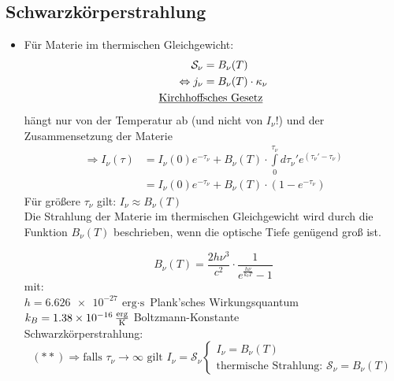 \subsection{Schwarzkörperstrahlung}
\begin{itemize}[label={$\to$}]
\item Für Materie im thermischen Gleichgewicht:
\begin{align*}
\mathcal{S}_\nu&=B_\nu(T)\\
\Leftrightarrow j_\nu &=B_\nu(T)\cdot\kappa_\nu\\
\text{\underline{Kirchhoff}}&\text{\underline{sches Gesetz}}
\end{align*}
hängt nur von der Temperatur ab (und nicht von $I_\nu$!) und der Zusammensetzung der Materie
\begin{align*}
\Rightarrow I_\nu (\tau)&=I_\nu(0)e^{-\tau_\nu}+B_\nu (T)\cdot\int\limits_0^{\tau_\nu}d\tau_\nu'e^{(\tau_\nu'-\tau_\nu)}\\
&=I_\nu(0)e^{-\tau_\nu}+B_\nu(T)\cdot(1-e^{-\tau_\nu})
\end{align*}
Für größere $\tau_\nu$ gilt: $I_\nu\approx B_\nu(T)$\\
Die Strahlung der Materie im thermischen Gleichgewicht wird durch die Funktion $B_\nu(T)$ beschrieben, wenn die optische Tiefe genügend groß ist.\\
\begin{equation*}
B_\nu(T)=\frac{2h\nu^3}{c^2}\cdot\frac{1}{e^{\frac{h\nu}{k_bT}}-1}
\end{equation*}
mit:\\
$h=\SI{6.626e-27}{\text{erg}\cdot\s}$ Plank'sches Wirkungsquantum\\
$k_B=\SI{1.38e-16}{\frac{\text{erg}}{\K}}$ Boltzmann-Konstante\\
Schwarzkörperstrahlung: 
\begin{equation*}
(\ast\ast) \Rightarrow \text{falls } \tau_\nu\to\infty \text{ gilt } I_\nu=\mathcal{S}_\nu \begin{cases} I_\nu=B_\nu(T) \\ \text{thermische Strahlung: } \mathcal{S}_\nu=B_\nu(T)\end{cases}
\end{equation*}

\end{itemize}
